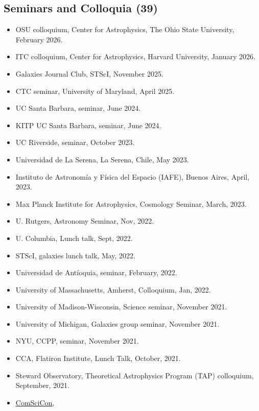 \documentclass[14pt]{article}
\begin{document}
\subsection*{Seminars and Colloquia (39)}
\begin{itemize}
  \setlength\itemsep{0.0em}
  \renewcommand\labelitemi{$\cdot$}

\item OSU colloquium, Center for Astrophysics, The Ohio State University, February 2026.\dag 
\item ITC colloquium, Center for Astrophysics, Harvard University, January 2026.\dag 
\item Galaxies Journal Club, STScI, November 2025.\dag 
\item CTC seminar, University of Maryland, April 2025.\dag 
\item UC Santa Barbara, seminar, June 2024. \dag
\item KITP UC Santa Barbara, seminar, June 2024. \dag
\item UC Riverside, seminar, October 2023. \dag
\item Universidad de La Serena, La Serena, Chile, May 2023. \dag 
\item Instituto de Astronom\'ia y F\'isica del Espacio (IAFE), Buenos Aires, April, 2023.
\item Max Planck Institute for Astrophysics, Cosmology Seminar, March, 2023.
\item U. Rutgers, Astronomy Seminar, Nov, 2022. \dag
\item U. Columbia, Lunch talk, Sept, 2022. \dag
\item STScI, galaxies lunch talk, May, 2022. \dag
\item Universidad de Ant\'ioquia, seminar, February, 2022. \dag 
\item University of Massachusetts, Amherst, Colloquium, Jan, 2022. \dag
\item University of Madison-Wisconsin, Science seminar, November 2021.\dag
\item University of Michigan, Galaxies group seminar, November 2021.\dag
\item NYU, CCPP, seminar, November 2021.\dag 
\item CCA, Flatiron Institute, Lunch Talk, October, 2021.
\item Steward Observatory, Theoretical Astrophysics Program (TAP) colloquium, September, 2021.\dag
\item \href{https://comscicon.com/comscicon-en-espa%C3%B1ol-2021}{ComSciCon},

\end{itemize}
\end{document}
